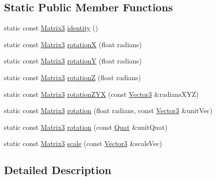 \subsection*{Static Public Member Functions}
\begin{DoxyCompactItemize}
\item 
static const \hyperlink{classVectormath_1_1Aos_1_1Matrix3}{Matrix3} \hyperlink{classVectormath_1_1Aos_1_1Matrix3_a3553add1d26e47cce929382077eafafa}{identity} ()
\item 
static const \hyperlink{classVectormath_1_1Aos_1_1Matrix3}{Matrix3} \hyperlink{classVectormath_1_1Aos_1_1Matrix3_a57b47f956c5ba2291a8d24996419f81d}{rotation\-X} (float radians)
\item 
static const \hyperlink{classVectormath_1_1Aos_1_1Matrix3}{Matrix3} \hyperlink{classVectormath_1_1Aos_1_1Matrix3_aee85d7099247c8de05d579b799360ae5}{rotation\-Y} (float radians)
\item 
static const \hyperlink{classVectormath_1_1Aos_1_1Matrix3}{Matrix3} \hyperlink{classVectormath_1_1Aos_1_1Matrix3_a3e242ff369ef241cff08c15e5a2c2676}{rotation\-Z} (float radians)
\item 
static const \hyperlink{classVectormath_1_1Aos_1_1Matrix3}{Matrix3} \hyperlink{classVectormath_1_1Aos_1_1Matrix3_a03544c6cc9acc3bf11190704e7ca559e}{rotation\-Z\-Y\-X} (const \hyperlink{classVectormath_1_1Aos_1_1Vector3}{Vector3} \&radians\-X\-Y\-Z)
\item 
static const \hyperlink{classVectormath_1_1Aos_1_1Matrix3}{Matrix3} \hyperlink{classVectormath_1_1Aos_1_1Matrix3_ac8e944d00bd8e26451a7f0c96ae06f4e}{rotation} (float radians, const \hyperlink{classVectormath_1_1Aos_1_1Vector3}{Vector3} \&unit\-Vec)
\item 
static const \hyperlink{classVectormath_1_1Aos_1_1Matrix3}{Matrix3} \hyperlink{classVectormath_1_1Aos_1_1Matrix3_aabf155c738cf3b9ac09e4ecf3008d0f0}{rotation} (const \hyperlink{classVectormath_1_1Aos_1_1Quat}{Quat} \&unit\-Quat)
\item 
static const \hyperlink{classVectormath_1_1Aos_1_1Matrix3}{Matrix3} \hyperlink{classVectormath_1_1Aos_1_1Matrix3_a05acf608f3bc7bbcfca7095018172f07}{scale} (const \hyperlink{classVectormath_1_1Aos_1_1Vector3}{Vector3} \&scale\-Vec)
\end{DoxyCompactItemize}


\subsection{Detailed Description}


